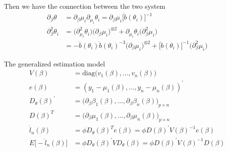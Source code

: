 Then we have the connection between the two system
\begin{align*}
\partial_{\beta} \theta &= \partial_{\beta} \mu_i \partial_{\mu_i} \theta_i = \partial_{\beta} \mu_i \Big[ \ddot{b}(\theta_i) \Big]^{-1} \\
\partial_{\beta}^2 \theta_i &= \Big( \partial^2_{\mu_i} \theta_i \Big) \Big( \partial_{\beta} \mu_i \Big)^{\otimes 2} + \partial_{\mu_i} \theta_i \Big( \partial_{\beta}^2 \mu_i \Big) \\
&= - \dddot{b}(\theta_i) \ddot{b}(\theta_i)^{-3} \Big( \partial_{\beta} \mu_i \Big)^{\otimes 2} + \Big[ \ddot{b}(\theta_i) \Big]^{-1} \Big( \partial^2_{\beta} \mu_i \Big)
\end{align*}

The generalized estimation model
\begin{align*}
V(\beta) &= \text{diag} \Big( v_1(\beta), …, v_n(\beta) \Big) \\
e(\beta) &= (y_1 - \mu_1(\beta), …, y_n- \mu_n(\beta))^{'} \\
D_{\theta} (\beta)^{'} &= \Big( \partial_{\beta} \beta_1(\beta),…,  \partial_{\beta} \beta_n(\beta)\Big)_{p \times n} \\
D (\beta)^{T} &= \Big( \partial_{\beta} \mu_1(\beta),…,  \partial_{\beta} \mu_n(\beta) \Big)_{p \times n} \\
\dot{l}_n(\beta) &= \phi D_{\theta}(\beta)^{T} e(\beta) = \phi D(\beta)^{'} V(\beta)^{-1} e(\beta) \\
E \Big[ -\ddot{l}_n(\beta) \Big] &= \phi D_{\theta}(\beta)^{'} V D_{\theta}(\beta) = \phi D(\beta)^{'} V(\beta)^{-1} D(\beta) 
\end{align*}


